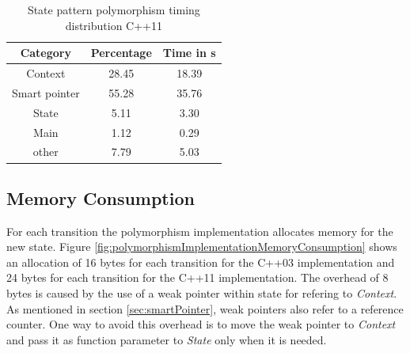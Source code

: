 {\begin{table}[h]\begin{center}
\begin{tabular}{|c|c|c|}\hline
\textbf{Category} & \textbf{Percentage} & \textbf{Time in s}\\
\hline
Context & 28.45 & 18.39\\
\hline
Smart pointer & 55.28 & 35.76\\
\hline
State & 5.11 & 3.30\\
\hline
Main & 1.12 & 0.29\\
\hline
other & 7.79 & 5.03\\
\hline
\end{tabular}
\caption{State pattern polymorphism timing distribution C++11}
\label{tab:StatePatternPolymorphismTimingDistributionCpp11}
\end{center}\end{table}
 
\FloatBarrier

\subsection{Memory Consumption}\label{sec:memoryConsumptionStatePatternPolymorphism}

\noindent For each transition the polymorphism implementation allocates memory for the new state. Figure \ref{fig:polymorphismImplementationMemoryConsumption} shows an allocation of 16 bytes for each transition for the C++03 implementation and 24 bytes for each transition for the C++11 implementation. The overhead of 8 bytes is caused by the use of a weak pointer within state for refering to \emph{Context}. As mentioned in section \ref{sec:smartPointer}, weak pointers also refer to a reference counter. One way to avoid this overhead is to move the weak pointer to \emph{Context} and pass it as function parameter to \emph{State} only when it is needed.  

}
